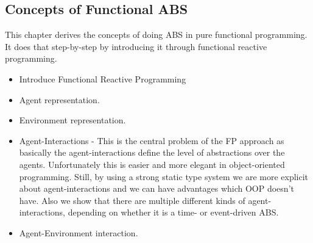 \subsection{Concepts of Functional ABS}
This chapter derives the concepts of doing ABS in pure functional programming. It does that step-by-step by introducing it through functional reactive programming.

\begin{itemize}
	\item Introduce Functional Reactive Programming
	\item Agent representation.
	\item Environment representation.
	\item Agent-Interactions - This is the central problem of the FP approach as basically the agent-interactions define the level of abstractions over the agents. Unfortunately this is easier and more elegant in object-oriented programming. Still, by using a strong static type system we are more explicit about agent-interactions and we can have advantages which OOP doesn't have. Also we show that there are multiple different kinds of agent-interactions, depending on whether it is a time- or event-driven ABS.
	\item Agent-Environment interaction.
\end{itemize}


